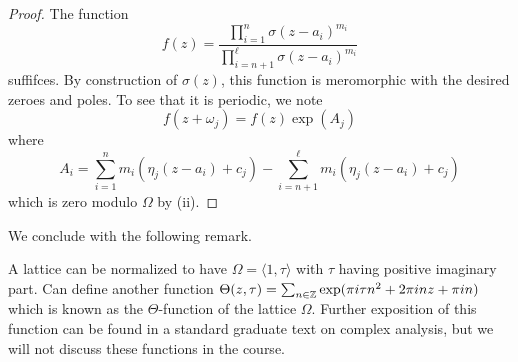 \begin{proof}
    The function 
    $$f(z)=\frac{\prod_{i=1}^{n}\sigma(z-a_{i})^{m_{i}}}{\prod_{i=n+1}^{\ell}\sigma(z-a_{i})^{m_{i}}}$$
    suffifces. By construction of $\sigma(z)$, this function is meromorphic with the desired zeroes and poles. To see that it is periodic, we note 
    $$f(z+\omega_{j})=f(z)\exp(A_{j})$$
    where
    $$A_{i}=\sum_{i=1}^{n}m_{i}(\eta_{j}(z-a_{i})+c_{j})-\sum_{i=n+1}^{\ell}m_{i}(\eta_{j}(z-a_{i})+c_{j})$$
    which is zero modulo $\Omega$ by  (ii). 
\end{proof}
We conclude with the following remark.
\begin{remark}
    A lattice can be normalized to have $\Omega=\langle1,\tau\rangle$ with $\tau$ having positive imaginary part. Can define another function $\Theta(z,\tau)=\sum_{n\in\mathbb{Z}}\exp(\pi i\tau n^{2}+2\pi i n z + \pi i n)$ which is known as the $\Theta$-function of the lattice $\Omega$. Further exposition of this function can be found in a standard graduate text on complex analysis, but we will not discuss these functions in the course. 
\end{remark}